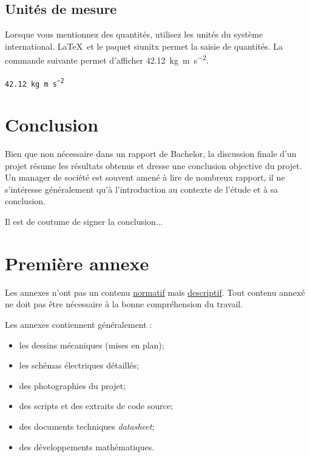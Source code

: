 \documentclass[
    iai, %
    eai, %
]{heig-tb}
\begin{document}
\section{Unités de mesure}

Lorsque vous mentionnez des quantités, utilisez les unités du système international. \LaTeX~et le paquet \textsf{siunitx} permet la saisie de quantités. La commande suivante permet d'afficher \SI{42.12}{\kilo\gram\metre\per\square\second}.\par

\texttt{\SI{42.12}{\kilo\gram\metre\per\square\second}}\par

\chapter{Conclusion}

Bien que non nécessaire dans un rapport de Bachelor, la discussion finale d'un projet résume les résultats obtenus et dresse une conclusion objective du projet. Un manager de société est souvent amené à lire de nombreux rapport, il ne s'intéresse généralement qu'à l'introduction au contexte de l'étude et à sa conclusion.

Il est de coutume de signer la conclusion...

\vfil
\hspace{8cm}\makeatletter\@author\makeatother\par
\hspace{8cm}\begin{minipage}{5cm}
  \printsignature
\end{minipage}
\clearpage

\appendix
\appendixpage
\addappheadtotoc

\chapter{Première annexe}

Les annexes n'ont pas un contenu \underline{normatif} mais \underline{descriptif}. Tout contenu annexé ne doit pas être nécessaire à la bonne compréhension du travail.

Les annexes contiennent généralement :

\begin{itemize}
  \item les dessins mécaniques (mises en plan);
  \item les schémas électriques détaillés;
  \item des photographies du projet;
  \item des scripts et des extraits de code source;
  \item des documents techniques \pex \emph{datasheet};
  \item des développements mathématiques.
\end{itemize}
\end{document}
